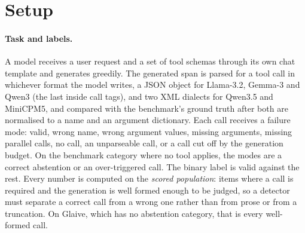 \section{Setup}
\label{sec:setup}

\paragraph{Task and labels.}
A model receives a user request and a set of tool schemas through its own chat template and generates greedily. The generated span is parsed for a tool call in whichever format the model writes, a JSON object for Llama-3.2, Gemma-3 and Qwen3 (the last inside call tags), and two XML dialects for Qwen3.5 and MiniCPM5, and compared with the benchmark's ground truth after both are normalised to a name and an argument dictionary. Each call receives a failure mode: valid, wrong name, wrong argument values, missing arguments, missing parallel calls, no call, an unparseable call, or a call cut off by the generation budget. On the benchmark category where no tool applies, the modes are a correct abstention or an over-triggered call. The binary label is valid against the rest. Every number is computed on the \emph{scored population}: items where a call is required and the generation is well formed enough to be judged, so a detector must separate a correct call from a wrong one rather than from prose or from a truncation. On Glaive, which has no abstention category, that is every well-formed call.


